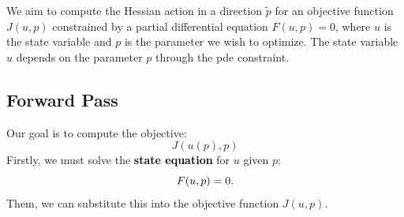 We aim to compute the Hessian action in a direction $\tilde{p}$ for an objective function $J(u,p)$ constrained by a partial differential equation $F(u,p) = 0$, where $u$ is the state variable and $p$ is the parameter we wish to optimize. The state variable $u$ depends on the parameter $p$ through the pde constraint. 

\subsection{Forward Pass}
Our goal is to compute the objective:
\begin{equation}
    J(u(p),p)
\end{equation}
Firstly, we must solve the \textcolor{black}{\textbf{state equation}} for $u$ given $p$:
\begin{equation}
   \color{black}{ F(u,p) = 0.}
\end{equation}
Them, we can substitute this into the objective function $J(u,p)$.

